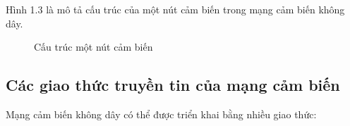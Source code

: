 Hình 1.3 là mô tả cấu trúc của một nút cảm biến trong mạng cảm biến không dây.


\begin{figure}[htb]
	\caption{\label{fig:my-label} Cấu trúc một nút cảm biến}
\end{figure}

\subsection{Các giao thức truyền tin của mạng cảm biến}
Mạng cảm biến không dây có thể được triển khai bằng nhiều giao thức: \cite{akkaya2005survey}


